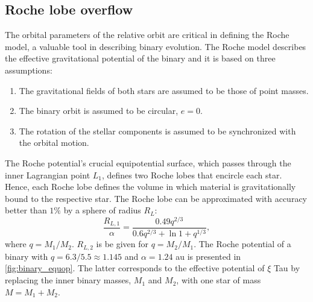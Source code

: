 \subsection{Roche lobe overflow}\label{sub:roche_lobe}

The orbital parameters of the relative orbit are critical in defining the Roche model, a valuable tool in describing binary evolution. The Roche model describes the effective gravitational potential of the binary and it is based on three assumptions:
\begin{enumerate}
    \item The gravitational fields of both stars are assumed to be those of point masses.
    \item The binary orbit is assumed to be circular, $e=0$.
    \item The rotation of the stellar components is assumed to be synchronized with the orbital motion. 
\end{enumerate}
The Roche potential's crucial equipotential surface, which passes through the inner Lagrangian point $L_1$, defines two Roche lobes that encircle each star. Hence, each Roche lobe defines the volume in which material is gravitationally bound to the respective star. The Roche lobe can be approximated with accuracy better than $1\%$ by a sphere of radius $R_L$:
\begin{equation}\label{eq:roche_lobe}
    \frac{R_{L,1}}{\alpha} = \frac{0.49q^{2/3}}{0.6q^{2/3} + \ln{1+q^{1/3}}},
\end{equation}
where $q =M_1 / M_2$. $R_{L,2}$ is be given for $q =M_2 / M_1$. The Roche potential of a binary with $q=6.3/5.5 \approx 1.145$ and $\alpha = 1.24$ au is presented in \cref{fig:binary_equop}. The latter corresponds to the effective potential of $\xi$ Tau by replacing the inner binary masses, $M_1$ and $M_2$, with one star of mass $M = M_1 + M_2$.
